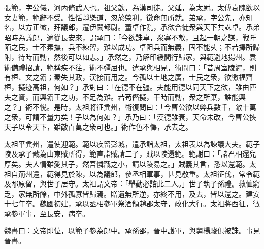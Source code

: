 
\begin{pinyinscope}
張範，字公儀，河內脩武人也。祖父歆，為漢司徒。父延，為太尉。太傅袁隗欲以女妻範，範辭不受。性恬靜樂道，忽於榮利，徵命無所就。弟承，字公先，亦知名，以方正徵，拜議郎，遷伊闕都尉。董卓作亂，承欲合徒衆與天下共誅卓。承弟昭時為議郎，適從長安來，謂承曰：「今欲誅卓，衆寡不敵，且起一朝之謀，戰阡陌之民，士不素撫，兵不練習，難以成功。卓阻兵而無義，固不能乆；不若擇所歸附，待時而動，然後可以如志。」承然之，乃解印綬間行歸家，與範避地揚州。袁術備禮招請，範稱疾不往，術不彊屈也。遣承與相見，術問曰：「昔周室陵遲，則有桓、文之霸；秦失其政，漢接而用之。今孤以土地之廣，士民之衆，欲徼福齊桓，擬迹高祖，何如？」承對曰：「在德不在彊。夫能用德以同天下之欲，雖由匹夫之資，而興霸王之功，不足為難。若苟僭擬，干時而動，衆之所棄，誰能興之？」術不恱。是時，太祖將征兾州，術復問曰：「今曹公欲以弊兵數千，敵十萬之衆，可謂不量力矣！子以為何如？」承乃曰：「漢德雖衰，天命未改，今曹公挾天子以令天下，雖敵百萬之衆可也。」術作色不懌，承去之。

太祖平兾州，遣使迎範。範以疾留彭城，遣承詣太祖，太祖表以為諫議大夫。範子陵及承子戩為山東賊所得，範直詣賊請二子，賊以陵還範。範謝曰：「諸君相還兒厚矣。夫人情雖愛其子，然吾憐戩之小，請以陵易之。」賊義其言，悉以還範。太祖自荊州還，範得見於陳，以為議郎，參丞相軍事，甚見敬重。太祖征伐，常令範及邴原留，與世子居守。太祖謂文帝：「舉動必諮此二人。」世子執子孫禮。救恤窮乏，家無所餘，中外孤寡皆歸焉。贈遺無所逆，亦終不用，及去，皆以還之。建安十七年卒。魏國初建，承以丞相參軍祭酒領趙郡太守，政化大行。太祖將西征，徵承參軍事，至長安，病卒。

魏書曰：文帝即位，以範子參為郎中。承孫邵，晉中護軍，與舅楊駿俱被誅。事見晉書。


\end{pinyinscope}